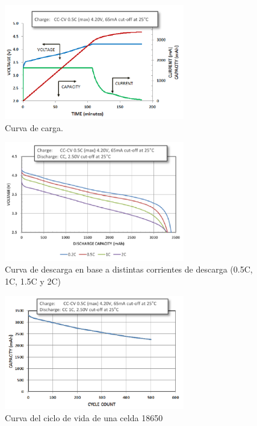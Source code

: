 \documentclass[10pt,a4paper]{article}
\begin{document}
	\begin{figure}[h!]
		\begin{center}
			\includegraphics[width=0.7\textwidth]{cc_cv_18650.png}
			\caption{Curva de carga.}
			\label{cc_cv}
		\end{center}
	\end{figure}
	
	\begin{figure}[h!]
		\begin{center}
			\includegraphics[width=0.7\textwidth]{discharge_18650.png}
			\caption{Curva de descarga en base a distintas corrientes de descarga (0.5C, 1C, 1.5C y 2C)}
			\label{descarga_18650}
		\end{center}
	\end{figure}
	
	\begin{figure}[h!]
		\begin{center}
			\includegraphics[width=0.7\textwidth]{life_cycle_18650.png}
			\caption{Curva del ciclo de vida de una celda 18650}
			\label{life_cycle_18650}
		\end{center}
	\end{figure}
	
\end{document}
